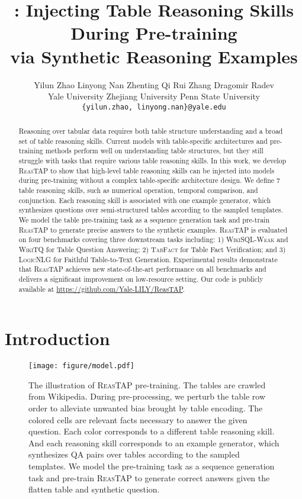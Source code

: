 \documentclass[11pt]{article}
\title{\ours: Injecting Table Reasoning Skills During Pre-training \\ via Synthetic Reasoning Examples}
\author{Yilun Zhao \quad Linyong Nan \quad Zhenting Qi \quad Rui Zhang \quad Dragomir Radev\\
Yale University \quad  Zhejiang University \quad Penn State University \\
\texttt{\{yilun.zhao, linyong.nan\}@yale.edu}
}
\newcommand{\ours}{\textsc{ReasTAP}\xspace}
\newcommand{\wikisql}{\textsc{WikiSQL-Weak}\xspace}
\newcommand{\tabfact}{\textsc{TabFact}\xspace}
\newcommand{\wtq}{\textsc{WikiTQ}\xspace}
\newcommand{\logicnlg}{\textsc{LogicNLG}\xspace}
\newcommand{\nreason}{7\xspace}
\begin{document}
\maketitle
\begin{abstract}
Reasoning over tabular data requires both table structure understanding and a broad set of table reasoning skills. Current models with table-specific architectures and pre-training methods perform well on understanding table structures, but they still struggle with tasks that require various table reasoning skills.
In this work, we develop \ours to show that high-level table reasoning skills can be injected into models during pre-training without a complex table-specific architecture design.
We define \nreason table reasoning skills, such as numerical operation, temporal comparison, and conjunction.
Each reasoning skill is associated with one example generator, which synthesizes questions over semi-structured tables according to the sampled templates.
We model the table pre-training task as a sequence generation task and pre-train \ours to generate precise answers to the synthetic examples.
\ours is evaluated on four benchmarks covering three downstream tasks including: 1) \wikisql and \wtq for Table Question Answering; 2) \tabfact for Table Fact Verification; and 3) \logicnlg for Faithful Table-to-Text Generation.
Experimental results demonstrate that \ours achieves new state-of-the-art performance on all benchmarks and delivers a significant improvement on low-resource setting.
Our code is publicly available at \url{https://github.com/Yale-LILY/ReasTAP}. \end{abstract}


\section{Introduction}
\begin{figure}[!t]
    \centering
    \texttt{[image: figure/model.pdf]}
    \caption{The illustration of \ours pre-training. The tables are crawled from Wikipedia. During pre-processing, we perturb the table row order to alleviate unwanted bias brought by table encoding. The colored cells are relevant facts necessary to answer the given question.  Each color corresponds to a different table reasoning skill. And each reasoning skill corresponds to an example generator, which synthesizes QA pairs over tables according to the sampled templates. We model the pre-training task as a sequence generation task and pre-train \ours to generate correct answers given the flatten table and synthetic question.}
    \label{example}
\end{figure}
\end{document}
